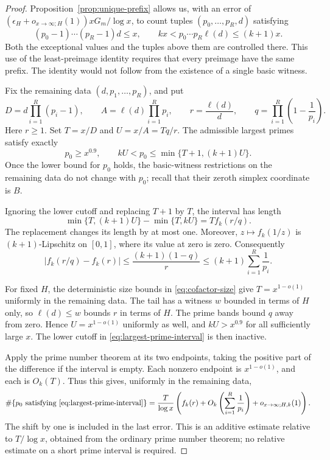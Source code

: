 \begin{proof}
Proposition~\ref{prop:unique-prefix} allows us, with an error of
\((\epsilon_H+o_{x\to\infty;H}(1))xG_m/\log x\), to count tuples
\((p_0,\ldots,p_R,d)\) satisfying
\[
 (p_0-1)\cdots(p_R-1)d\leq x,
 \qquad
 kx<p_0\cdots p_R\ell(d)\leq(k+1)x.
\]
Both the exceptional values and the tuples above them are controlled
there.  This use of the least-preimage identity requires that every
preimage have the same prefix.  The identity would not follow from the
existence of a single basic witness.

Fix the remaining data \((d,p_1,\ldots,p_R)\), and put
\[
 D=d\prod_{i=1}^R(p_i-1),\qquad
 A=\ell(d)\prod_{i=1}^Rp_i,\qquad
 r=\frac{\ell(d)}d,\qquad
 q=\prod_{i=1}^R\left(1-\frac1{p_i}\right).
\]
Here \(r\geq1\).  Set \(T=x/D\) and \(U=x/A=Tq/r\).
The admissible largest primes satisfy exactly
\begin{equation}\label{eq:largest-prime-interval}
 p_0\geq x^{0.9},\qquad
 kU<p_0\leq\min\{T+1,(k+1)U\}.
\end{equation}
Once the lower bound for \(p_0\) holds, the basic-witness restrictions
on the remaining data do not change with \(p_0\); recall that their
zeroth simplex coordinate is \(B\).

Ignoring the lower cutoff and replacing \(T+1\) by \(T\), the interval
has length
\[
 \min\{T,(k+1)U\}-\min\{T,kU\}=T f_k(r/q).
\]
The replacement changes its length by at most one.  Moreover,
\(z\mapsto f_k(1/z)\) is \((k+1)\)-Lipschitz on \([0,1]\),
where its value at zero is zero.  Consequently
\begin{equation}\label{eq:weight-perturbation}
 |f_k(r/q)-f_k(r)|
 \leq\frac{(k+1)(1-q)}r
 \leq(k+1)\sum_{i=1}^R\frac1{p_i}.
\end{equation}

For fixed \(H\), the deterministic size bounds in
\eqref{eq:cofactor-size} give \(T=x^{1-o(1)}\) uniformly in the
remaining data.  The tail has a witness \(w\) bounded in terms of
\(H\) only, so \(\ell(d)\leq w\) bounds \(r\) in terms of \(H\).
The prime bands bound \(q\) away from zero.  Hence
\(U=x^{1-o(1)}\) uniformly as well, and \(kU>x^{0.9}\) for all
sufficiently large \(x\).  The lower cutoff in
\eqref{eq:largest-prime-interval} is then inactive.

Apply the prime number theorem at its two endpoints, taking the positive
part of the difference if the interval is empty.  Each nonzero endpoint
is \(x^{1-o(1)}\), and each is \(O_k(T)\).  Thus this gives, uniformly
in the remaining data,
\[
 \#\{p_0\text{ satisfying \eqref{eq:largest-prime-interval}}\}
 =\frac{T}{\log x}
   \left(f_k(r)+O_k\left(\sum_{i=1}^R\frac1{p_i}\right)
                +o_{x\to\infty;H,k}(1)\right).
\]
The shift by one is included in the last error.  This is an additive
estimate relative to \(T/\log x\), obtained from the ordinary prime
number theorem; no relative estimate on a short prime interval is
required.


\end{proof}
